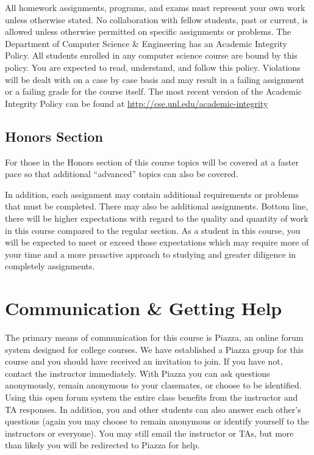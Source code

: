\documentclass[12pt]{scrartcl}
\begin{document}
All homework assignments, programs, and exams must represent
your own work unless otherwise stated.  No collaboration with 
fellow students, past or current, is allowed unless otherwise 
permitted on specific assignments or problems.  The Department of
Computer Science \& Engineering has an Academic Integrity Policy.  
All students enrolled in any computer science course are bound 
by this policy.  You are expected to read, understand, and follow 
this policy.  Violations will be dealt with on a case by case 
basis and may result in a failing assignment or a failing grade 
for the course itself.  The most recent version of the Academic 
Integrity Policy can be found at \url{http://cse.unl.edu/academic-integrity}

\subsection{Honors Section}

For those in the Honors section of this course topics will be 
covered at a faster pace so that additional ``advanced'' topics
can also be covered.  

In addition, each assignment may contain additional requirements or 
problems that must be completed.  There may also be additional 
assignments.  Bottom line, there will be higher expectations with 
regard to the quality and quantity of work in this course compared 
to the regular section.  As a student in this course, you will be 
expected to meet or exceed those expectations which may require more 
of your time and a more proactive approach to studying and greater 
diligence in completely assignments.  

\section{Communication \& Getting Help}

The primary means of communication for this course is Piazza, an online
forum system designed for college courses.  We have established a Piazza 
group for this course and you should have received an invitation to join.
If you have not, contact the instructor immediately.  With Piazza you 
can ask questions anonymously, remain anonymous to your classmates, or 
choose to be identified.  Using this open forum system the entire class 
benefits from the instructor and TA responses.  In addition, you and 
other students can also answer each other's questions (again you may
choose to remain anonymous or identify yourself to the instructors or
everyone).  You may still email the instructor or TAs, but more than 
likely you will be redirected to Piazza for help.
\end{document}

